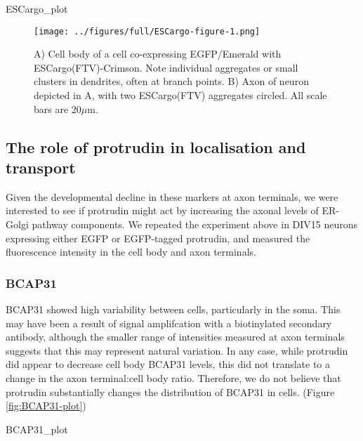 \documentclass[
  12pt,
  a4paper,
]{book}
\newenvironment{Shaded}{\begin{snugshade}}{\end{snugshade}}
\newcommand{\NormalTok}[1]{#1}
\begin{document}
\begin{Shaded}
\begin{Highlighting}[]
\NormalTok{ESCargo\_plot}
\end{Highlighting}
\end{Shaded}

\begin{figure}
\centering
\texttt{[image: ../figures/full/ESCargo-figure-1.png]}
\caption{\label{fig:ESCargo-figure}A) Cell body of a cell co-expressing EGFP/Emerald with ESCargo(FTV)-Crimson. Note individual aggregates or small clusters in dendrites, often at branch points. B) Axon of neuron depicted in A, with two ESCargo(FTV) aggregates circled. All scale bars are 20\(\mu\)m.}
\end{figure}

\hypertarget{the-role-of-protrudin-in-localisation-and-transport}{%
\subsection{The role of protrudin in localisation and transport}\label{the-role-of-protrudin-in-localisation-and-transport}}

Given the developmental decline in these markers at axon terminals, we were interested to see if protrudin might act by increasing the axonal levels of ER-Golgi pathway components. We repeated the experiment above in DIV15 neurons expressing either EGFP or EGFP-tagged protrudin, and measured the fluorescence intensity in the cell body and axon terminals.

\hypertarget{bcap31}{%
\subsubsection{BCAP31}\label{bcap31}}

BCAP31 showed high variability between cells, particularly in the soma. This may have been a result of signal amplifcation with a biotinylated secondary antibody, although the smaller range of intensities measured at axon terminals suggests that this may represent natural variation. In any case, while protrudin did appear to decrease cell body BCAP31 levels, this did not translate to a change in the axon terminal:cell body ratio. Therefore, we do not believe that protrudin substantially changes the distribution of BCAP31 in cells. (Figure \ref{fig:BCAP31-plot})

\begin{Shaded}
\begin{Highlighting}[]
\NormalTok{BCAP31\_plot}
\end{Highlighting}
\end{Shaded}
\end{document}
